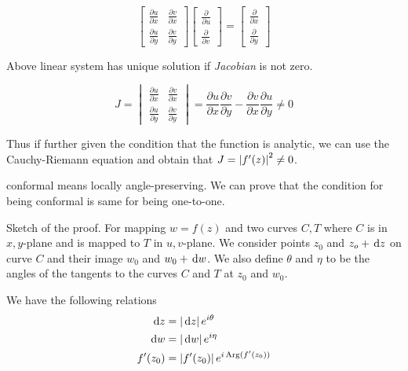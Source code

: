 \documentclass{article}
\begin{document}
\begin{equation*}
    \begin{bmatrix}
    \frac{\partial u}{\partial x} & \frac{\partial v}{\partial x}\\
    \frac{\partial u}{\partial y} & \frac{\partial v}{\partial y}
    \end{bmatrix} \begin{bmatrix}
        \frac{\partial}{\partial u}\\
        \frac{\partial}{\partial v}
    \end{bmatrix} = \begin{bmatrix}
        \frac{\partial}{\partial x}\\
        \frac{\partial}{\partial y}
    \end{bmatrix}    
\end{equation*}

Above linear system has unique solution if {\em Jacobian} is not zero.

\begin{equation*}
    J = \begin{vmatrix}
        \frac{\partial u}{\partial x} & \frac{\partial v}{\partial x}\\
        \frac{\partial u}{\partial y} & \frac{\partial v}{\partial y}
    \end{vmatrix} = \frac{\partial u}{\partial x} \frac{\partial v}{\partial y}- \frac{\partial v}{\partial x}\frac{\partial u}{\partial y} \neq 0
\end{equation*}

Thus if further given the condition that the function is analytic, we can use the Cauchy-Riemann equation and obtain that \(J = \left\vert f'(z)\right\vert^2\neq 0\).

\begin{theorem}
    conformal means locally angle-preserving. We can prove that the condition for being conformal is same for being one-to-one.
\end{theorem}

Sketch of the proof. For mapping \(w=f(z)\) and two curves \(C,T\) where \(C\) is in \(x,y\)-plane and is mapped to \(T\) in \(u,v\)-plane. We consider points \(z_0\) and \(z_o+\,\mathrm{d} z\) on curve \(C\) and their image \(w_0\) and \(w_0+\,\mathrm{d} w\). We also define \(\theta\) and \(\eta\) to be the angles of the tangents to the curves \(C\) and \(T\) at \(z_0\) and \(w_0\).

We have the following relations
\begin{align*}
    \,\mathrm{d} z &= \left\vert\,\mathrm{d} z\right\vert e^{i\theta}\\
    \,\mathrm{d} w &= \left\vert\,\mathrm{d} w\right\vert e^{i\eta}\\
    f'(z_0)&= \left\vert f'(z_0)\right\vert e^{i\operatorname*{Arg}(f'(z_0))}
\end{align*}
\end{document}
